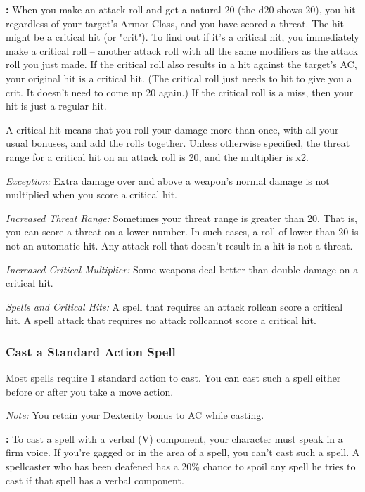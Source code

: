 \textbf{:} When you make an attack roll and get a natural 20 (the d20 shows 20), you hit regardless of your target's Armor Class, and you have scored a threat. The hit might be a critical hit (or "crit"). To find out if it's a critical hit, you immediately make a critical roll -- another attack roll with all the same modifiers as the attack roll you just made. If the critical roll also results in a hit against the target's AC, your original hit is a critical hit. (The critical roll just needs to hit to give you a crit. It doesn't need to come up 20 again.) If the critical roll is a miss, then your hit is just a regular hit.

A critical hit means that you roll your damage more than once, with all your usual bonuses, and add the rolls together. Unless otherwise specified, the threat range for a critical hit on an attack roll is 20, and the multiplier is x2.

\textit{Exception:} Extra damage over and above a weapon's normal damage is not multiplied when you score a critical hit.

\textit{Increased Threat Range:} Sometimes your threat range is greater than 20. That is, you can score a threat on a lower number. In such cases, a roll of lower than 20 is not an automatic hit. Any attack roll that doesn't result in a hit is not a threat.

\textit{Increased Critical Multiplier:} Some weapons deal better than double damage on a critical hit.

\textit{Spells and Critical Hits:} A spell that requires an attack rollcan score a critical hit. A spell attack that requires no attack rollcannot score a critical hit.

\subsubsection{Cast a Standard Action Spell}

Most spells require 1 standard action to cast. You can cast such a spell either before or after you take a move action. 

\textit{Note:} You retain your Dexterity bonus to AC while casting.

\textbf{:} To cast a spell with a verbal (V) component, your character must speak in a firm voice. If you're gagged or in the area of a  spell, you can't cast such a spell. A spellcaster who has been deafened has a 20\% chance to spoil any spell he tries to cast if that spell has a verbal component.

